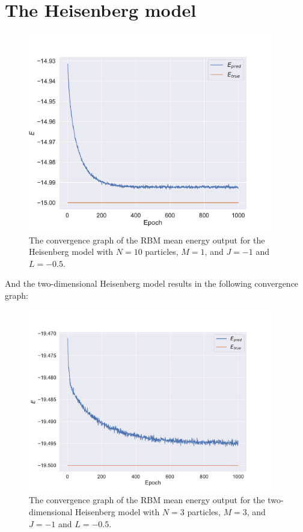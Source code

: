 \section{The Heisenberg model}


\begin{figure}[H]
  \begin{center}
    \includegraphics[width=0.95\textwidth]{Figures/Plots/Heisen/heisen_conv10}
  \end{center}
  \caption{The convergence graph of the RBM mean energy output for the Heisenberg model with $N = 10$ particles, $M=1$, and $J=-1$ and $L=-0.5$.}
\end{figure}

And the two-dimensional Heisenberg model results in the following convergence graph:

\begin{figure}[H]
  \begin{center}
    \includegraphics[width=0.95\textwidth]{Figures/Plots/Heisen/heisen_conv33}
  \end{center}
  \caption{The convergence graph of the RBM mean energy output for the two-dimensional Heisenberg model with $N = 3$ particles, $M=3$, and $J=-1$ and $L=-0.5$.}
\end{figure}

